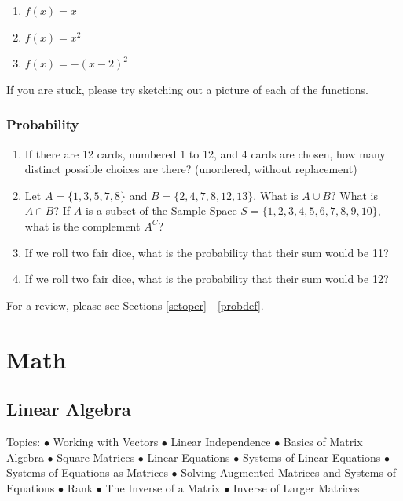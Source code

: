 \documentclass[]{book}
\providecommand{\tightlist}{%
  \setlength{\itemsep}{0pt}\setlength{\parskip}{0pt}}
\theoremstyle{definition}
\theoremstyle{definition}
\theoremstyle{definition}
\theoremstyle{remark}
\begin{document}
\begin{enumerate}
\def\labelenumi{\arabic{enumi}.}
\tightlist
\item
  \(f(x) = x\)
\item
  \(f(x) = x^2\)
\item
  \(f(x) = -(x - 2)^2\)
\end{enumerate}

If you are stuck, please try sketching out a picture of each of the functions.

\hypertarget{probability}{%
\section*{Probability}\label{probability}}

\begin{enumerate}
\def\labelenumi{\arabic{enumi}.}
\tightlist
\item
  If there are 12 cards, numbered 1 to 12, and 4 cards are chosen, how many distinct possible choices are there? (unordered, without replacement)
\item
  Let \(A = \{1,3,5,7,8\}\) and \(B = \{2,4,7,8,12,13\}\). What is \(A \cup B\)? What is \(A \cap B\)? If \(A\) is a subset of the Sample Space \(S = \{1,2,3,4,5,6,7,8,9,10\}\), what is the complement \(A^C\)?
\item
  If we roll two fair dice, what is the probability that their sum would be 11?
\item
  If we roll two fair dice, what is the probability that their sum would be 12?
\end{enumerate}

For a review, please see Sections \ref{setoper} - \ref{probdef}.

\hypertarget{part-math}{%
\part{Math}\label{part-math}}

\hypertarget{linearalgebra}{%
\chapter{Linear Algebra}\label{linearalgebra}}

Topics:
\(\bullet\) Working with Vectors
\(\bullet\) Linear Independence
\(\bullet\) Basics of Matrix Algebra
\(\bullet\) Square Matrices
\(\bullet\) Linear Equations
\(\bullet\) Systems of Linear Equations
\(\bullet\) Systems of Equations as Matrices
\(\bullet\) Solving Augmented Matrices and Systems of Equations
\(\bullet\) Rank
\(\bullet\) The Inverse of a Matrix
\(\bullet\) Inverse of Larger Matrices
\end{document}
